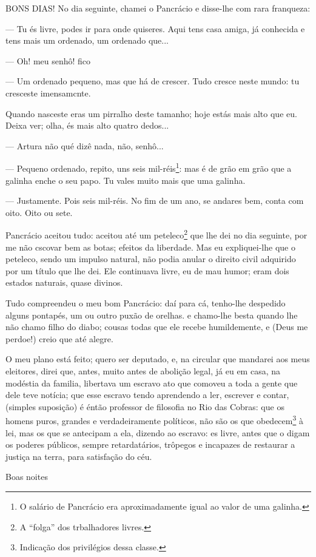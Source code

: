 \begin{corollary}{BONS DIAS!}
No dia seguinte, chamei o Pancrácio e disse-lhe com rara franqueza:

— Tu és livre, podes ir para onde quiseres. Aqui tens casa amiga, já conhecida e tens mais um ordenado, um ordenado que...

— Oh! meu senhô! fico

— Um ordenado pequeno, mas que há de crescer. Tudo cresce neste mundo: tu cresceste imensamcnte.

Quando nasceste eras um pirralho deste tamanho; hoje estás mais alto que eu. Deixa ver; olha, és mais alto quatro dedos...

— Artura não qué dizê nada, não, senhô...

— Pequeno ordenado, repito, uns seis mil-réis\footnote{O salário de Pancrácio era aproximadamente igual ao valor de uma galinha.}: mas é de grão em grão que a galinha enche o seu papo. Tu vales muito mais que uma galinha.

— Justamente. Pois seis mil-réis. No fim de um ano, se andares bem, conta com oito. Oito ou sete. 

Pancrácio aceitou tudo: aceitou até um peteleco\footnote{A ``folga'' dos trbalhadores livres.} que lhe dei no dia seguinte, por me não cscovar bem as botas; efeitos da liberdade. Mas eu expliquei-lhe que o peteleco, sendo um impulso natural, não podia anular o direito civil adquirido por um título que lhe dei. Ele continuava livre, eu de mau humor; eram dois estados naturais, quase divinos.

Tudo compreendeu o meu bom Pancrácio: daí para cá, tenho-lhe despedido alguns pontapés, um ou outro puxão de orelhas. e chamo-lhe besta quando lhe não chamo filho do diabo; cousas todas que ele recebe humildemente, e (Deus me perdoe!) creio que até alegre.

O meu plano está feito; quero ser deputado, e, na circular que mandarei aos meus eleitores, direi que, antes, muito antes de abolição legal, já eu em casa, na modéstia da familia, libertava um escravo ato que comoveu a toda a gente que dele teve notícia; que esse escravo tendo aprendendo a ler, escrever e contar, (simples suposição) é éntão professor de filosofia no Rio das Cobras: que os homens puros, grandes e verdadeiramente políticos, não são os que obedecem\footnote{Indicação dos privilégios dessa classe.} à lei, mas os que se antecipam a ela, dizendo ao escravo: es livre, antes que o digam os poderes públicos, sempre retardatários, trôpegos e incapazes de restaurar a justiça na terra, para satisfação do céu.

Boas noites
\end{corollary}

